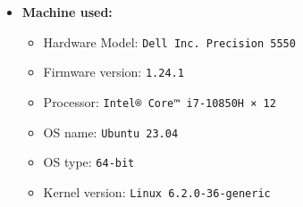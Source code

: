 \documentclass{article}
\begin{document}
\begin{itemize}
    \item \textbf{Machine used:}
    \begin{itemize}
      \item Hardware Model: \texttt{Dell Inc. Precision 5550}
      \item Firmware version: \texttt{1.24.1}
      \item Processor: \texttt{Intel® Core™ i7-10850H × 12}
      \item OS name: \texttt{Ubuntu 23.04}
      \item OS type: \texttt{64-bit}
      \item Kernel version: \texttt{Linux 6.2.0-36-generic}
    \end{itemize}
\end{itemize}
\end{document}
